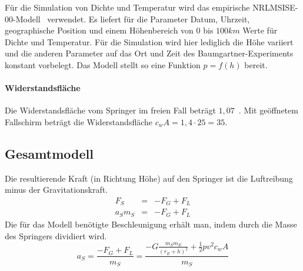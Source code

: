 Für die Simulation von Dichte und Temperatur wird das empirische NRLMSISE-00-Modell~\cite{nrlmsise00:goddardspaceflightcenter} verwendet.
Es liefert für die Parameter Datum, Uhrzeit, geographische Position und einem Höhenbereich von $0$ bis $100km$ Werte für Dichte und Temperatur.
Für die Simulation wird hier lediglich die Höhe variiert und die anderen Parameter auf das Ort und Zeit des Baumgartner-Experiments konstant vorbelegt.
Das Modell stellt so eine Funktion $p=f(h)$ bereit.

\paragraph{Widerstandsfläche}
Die Widerstandsfläche vom Springer im freien Fall beträgt $1,07$~\cite[59]{redbulletin:stratosspecialde}.
Mit geöffnetem Fallschirm beträgt die Widerstandsfläche $c_wA=1,4\cdot25=35$.

\subsection{Gesamtmodell}

Die resultierende Kraft (in Richtung Höhe) auf den Springer ist die Luftreibung minus der Gravitationskraft.
\begin{eqnarray*}
  F_S &=& -F_G+F_L \\
  a_Sm_S &=& -F_G+F_L
\end{eqnarray*}
Die für das Modell benötigte Beschleunigung erhält man, indem durch die Masse des Springers dividiert wird.
\begin{equation}
  a_S = \frac{-F_G+F_L}{m_S} = \frac{-G\frac{m_Sm_E}{(r_E+h)^2}+\frac{1}{2}pv^2c_wA}{m_S}
\end{equation}
